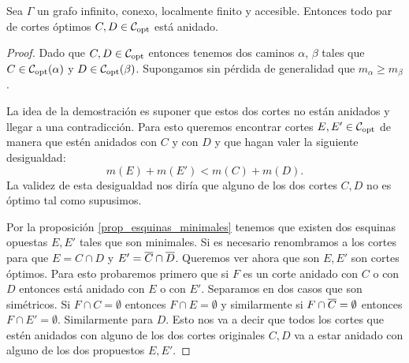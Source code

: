 \documentclass[tesis.tex]{subfiles}
\begin{document}
\begin{teo}\label{teo_copt_anidados}
	Sea $\Gamma$ un grafo infinito, conexo, localmente finito y accesible.
	Entonces todo par de cortes óptimos $C,D \in {\cal C}_{\text{opt}}$ está anidado.
\end{teo}
\begin{proof}
	Dado que $C, D \in {\cal C}_{\text{opt}}$ entonces tenemos dos caminos $\alpha$, $\beta$ tales que $C \in {\cal C}_{\text{opt}}(\alpha)$ y $D \in {\cal C}_{\text{opt}}(\beta)$.
	Supongamos sin pérdida de generalidad que $m_{\alpha} \ge m_{\beta}$.
	
	La idea de la demostración es suponer que estos dos cortes no están anidados y llegar a una contradicción.
	Para esto queremos encontrar cortes $E, E' \in {\cal C}_{\text{opt}}$ de manera que estén anidados con $C$ y con $D$ y que hagan valer la siguiente desigualdad:
	\[
	m(E) + m(E') < m(C) + m(D).
	\]   
	La validez de esta desigualdad nos diría que alguno de los dos cortes $C,D$ no es óptimo tal como supusimos.
	
	Por la proposición \ref{prop_esquinas_minimales} tenemos que existen dos esquinas opuestas $ E, E' $ tales que son minimales.	
	Si es necesario renombramos a los cortes para que $E = C \cap D$ y $E' = \overline C \cap \overline D$.
	Queremos ver ahora que son $E,E'$ son cortes óptimos.	
	Para esto probaremos primero que si $F$ es un corte anidado con $C$ o con $D$ entonces está anidado con $E$ o con $E'$.
	Separamos en dos casos que son simétricos.
	Si $F \cap C = \emptyset$ entonces $F \cap E= \emptyset$ y similarmente si $F \cap \overline C = \emptyset$ entonces $F \cap E' = \emptyset$.
	Similarmente para $D$.
	Esto nos va a decir que todos los cortes que estén anidados con alguno de los dos cortes originales $C,D$ va a estar anidado con alguno de los dos propuestos $E,E'$.
	

\end{proof}
\end{document}
